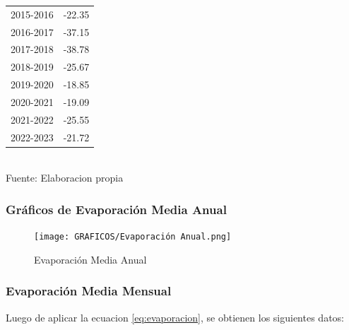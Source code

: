 \documentclass{article} %
\begin{document}
\begin{table}[ht]
\begin{tabular}{|c|c|}
        2015-2016 & -22.35 \\
        2016-2017 & -37.15 \\
        2017-2018 & -38.78 \\
        2018-2019 & -25.67 \\
        2019-2020 & -18.85 \\
        2020-2021 & -19.09 \\
        2021-2022 & -25.55 \\
        2022-2023 & -21.72 \\
        \hline
    \end{tabular}
    \label{tab:precipitaciones_anuales}
    \vspace{0.2cm}
    \\Fuente: Elaboracion propia
\end{table}

\newpage
\subsubsection{Gráficos de Evaporación Media Anual}

\begin{figure}[h!]
    \centering
    \texttt{[image: GRAFICOS/Evaporación Anual.png]}
    \caption{Evaporación Media Anual}
    \label{fig:evaporacion_media}
\end{figure}
\newpage
\subsubsection{Evaporación Media Mensual}

Luego de aplicar la ecuacion \ref{eq:evaporacion}, se obtienen los siguientes datos:
\end{document}
